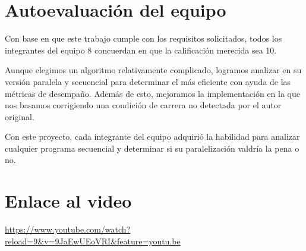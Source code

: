 \documentclass[11pt]{article}
\begin{document}
\section{Autoevaluación del equipo}
Con base en que este trabajo cumple con los requisitos solicitados, todos los integrantes del equipo 8 concuerdan en que la calificación merecida sea 10.
\par 
Aunque elegimos un algoritmo relativamente complicado, logramos analizar en su versión paralela y secuencial para determinar el más eficiente con ayuda de las métricas de desempaño. Además de esto, mejoramos la implementación en la que nos basamos corrigiendo una condición de carrera no detectada por el autor original.
\par 
Con este proyecto, cada integrante del equipo adquirió la habilidad para analizar cualquier programa secuencial y determinar si su paralelización valdría la pena o no.

\section{Enlace al video}
\par
\url{https://www.youtube.com/watch?reload=9&v=9JaEwUEoVRI&feature=youtu.be}
\end{document}
